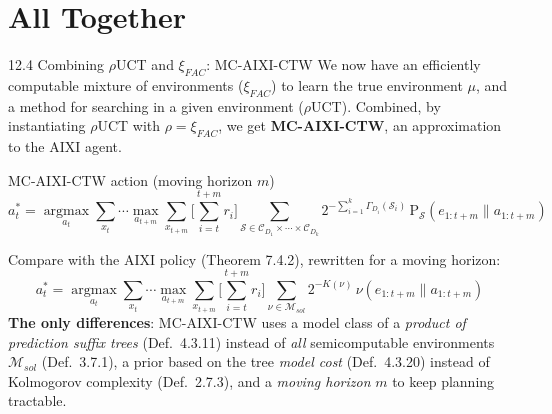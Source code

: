\documentclass[aspectratio=169,10pt]{beamer}
\newcommand{\Mcal}{\mathcal{M}}
\newcommand{\Scal}{\mathcal{S}}
\newcommand{\CDi}[1]{\mathcal{C}_{D_{#1}}}
\begin{document}
\section{All Together}

\begin{frame}{12.4 Combining $\rho$UCT and $\xi_{FAC}$: MC-AIXI-CTW}
We now have an efficiently computable mixture of environments ($\xi_{FAC}$) to learn the
true environment $\mu$, and a method for searching in a given environment ($\rho$UCT).
Combined, by instantiating $\rho$UCT with $\rho=\xi_{FAC}$, we get \textbf{MC-AIXI-CTW}, an
approximation to the AIXI agent.
\begin{block}{MC-AIXI-CTW action (moving horizon $m$)}
$$a_t^* = \operatorname*{argmax}_{a_t}\sum_{x_t}\cdots\max_{a_{t+m}}\sum_{x_{t+m}}
\Big[\sum_{i=t}^{t+m}r_i\Big]\sum_{\Scal\in\CDi{1}\times\cdots\times\CDi{k}}
2^{-\sum_{i=1}^k\Gamma_{D_i}(\Scal_i)}\, \mathrm{P}_\Scal(e_{1:t+m}\|a_{1:t+m})$$
\end{block}
Compare with the AIXI policy (Theorem 7.4.2), rewritten for a moving horizon:
$$a_t^* = \operatorname*{argmax}_{a_t}\sum_{x_t}\cdots\max_{a_{t+m}}\sum_{x_{t+m}}
\Big[\sum_{i=t}^{t+m}r_i\Big]\sum_{\nu\in\Mcal_{sol}} 2^{-K(\nu)}\,\nu(e_{1:t+m}\|a_{1:t+m})$$
\textbf{The only differences}: MC-AIXI-CTW uses a model class of a \emph{product of
prediction suffix trees} (Def.\ 4.3.11) instead of \emph{all} semicomputable environments
$\Mcal_{sol}$ (Def.\ 3.7.1), a prior based on the tree \emph{model cost} (Def.\ 4.3.20)
instead of Kolmogorov complexity (Def.\ 2.7.3), and a \emph{moving horizon} $m$ to keep
planning tractable.
\end{frame}
\end{document}
